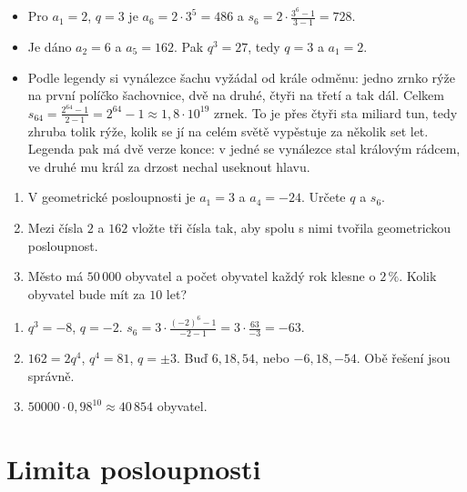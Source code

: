 \begin{example}
  \begin{itemize}
    \item Pro $a_1 = 2$, $q = 3$ je $a_6 = 2\cdot 3^5 = 486$ a $s_6 = 2\cdot\frac{3^6 - 1}{3 - 1} = 728$.
    \item Je dáno $a_2 = 6$ a $a_5 = 162$. Pak $q^3 = 27$, tedy $q = 3$ a $a_1 = 2$.
    \item Podle legendy si vynálezce šachu vyžádal od krále odměnu: jedno zrnko rýže na první políčko šachovnice, dvě na druhé, čtyři na třetí a tak dál. Celkem $s_{64} = \frac{2^{64} - 1}{2 - 1} = 2^{64} - 1\approx 1{,}8\cdot 10^{19}$ zrnek. To je přes čtyři sta miliard tun, tedy zhruba tolik rýže, kolik se jí na celém světě vypěstuje za několik set let. Legenda pak má dvě verze konce: v jedné se vynálezce stal královým rádcem, ve druhé mu král za drzost nechal useknout hlavu.
  \end{itemize}
\end{example}

\begin{problem}
  \begin{enumerate}[label=(\alph*)]
    \item V geometrické posloupnosti je $a_1 = 3$ a $a_4 = -24$. Určete $q$ a $s_6$.
    \item Mezi čísla $2$ a $162$ vložte tři čísla tak, aby spolu s nimi tvořila geometrickou posloupnost.
    \item Město má $50\,000$ obyvatel a počet obyvatel každý rok klesne o $2\,\%$. Kolik obyvatel bude mít za $10$ let?
  \end{enumerate}
\end{problem}

\begin{solution}
  \begin{enumerate}[label=(\alph*)]
    \item $q^3 = -8$, $q = -2$. $s_6 = 3\cdot\frac{{(-2)}^6 - 1}{-2 - 1} = 3\cdot\frac{63}{-3} = -63$.
    \item $162 = 2q^4$, $q^4 = 81$, $q = \pm 3$. Buď $6, 18, 54$, nebo $-6, 18, -54$. Obě řešení jsou správně.
    \item $50000\cdot 0{,}98^{10}\approx 40\,854$ obyvatel.
  \end{enumerate}
\end{solution}

\section{Limita posloupnosti}\label{sec:limita-posloupnosti}

